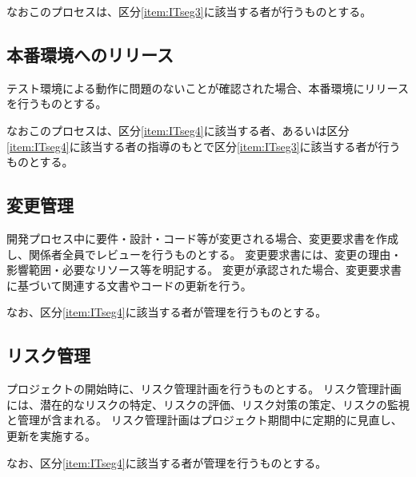 なおこのプロセスは、区分\ref{item:ITseg3}\hx に該当する者が行うものとする。

\subsection{本番環境へのリリース}
テスト環境による動作に問題のないことが確認された場合、本番環境にリリースを行うものとする。

なおこのプロセスは、区分\ref{item:ITseg4}\hx に該当する者、あるいは区分\ref{item:ITseg4}\hx に該当する者の指導のもとで区分\ref{item:ITseg3}\hx に該当する者が行うものとする。

\subsection{変更管理}
開発プロセス中に要件・設計・コード等が変更される場合、変更要求書を作成し、関係者全員でレビューを行うものとする。
変更要求書には、変更の理由・影響範囲・必要なリソース等を明記する。
変更が承認された場合、変更要求書に基づいて関連する文書やコードの更新を行う。

なお、区分\ref{item:ITseg4}\hx に該当する者が管理を行うものとする。

\subsection{リスク管理}
プロジェクトの開始時に、リスク管理計画を行うものとする。
リスク管理計画には、潜在的なリスクの特定、リスクの評価、リスク対策の策定、リスクの監視と管理が含まれる。
リスク管理計画はプロジェクト期間中に定期的に見直し、更新を実施する。

なお、区分\ref{item:ITseg4}\hx に該当する者が管理を行うものとする。

